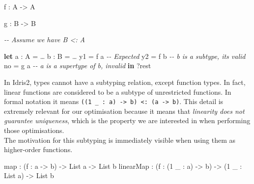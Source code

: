 \documentclass[
]{article}
\newenvironment{Shaded}{}{}
\newcommand{\CommentTok}[1]{\textcolor[rgb]{0.38,0.63,0.69}{\textit{#1}}}
\newcommand{\DataTypeTok}[1]{\textcolor[rgb]{0.56,0.13,0.00}{#1}}
\newcommand{\DecValTok}[1]{\textcolor[rgb]{0.25,0.63,0.44}{#1}}
\newcommand{\FunctionTok}[1]{\textcolor[rgb]{0.02,0.16,0.49}{#1}}
\newcommand{\KeywordTok}[1]{\textcolor[rgb]{0.00,0.44,0.13}{\textbf{#1}}}
\newcommand{\NormalTok}[1]{#1}
\newcommand{\OperatorTok}[1]{\textcolor[rgb]{0.40,0.40,0.40}{#1}}
\newcommand{\OtherTok}[1]{\textcolor[rgb]{0.00,0.44,0.13}{#1}}
\begin{document}
\begin{Shaded}
\begin{Highlighting}[]

\NormalTok{f }\OperatorTok{:} \DataTypeTok{A} \OtherTok{{-}\textgreater{}} \DataTypeTok{A}

\NormalTok{g }\OperatorTok{:} \DataTypeTok{B} \OtherTok{{-}\textgreater{}} \DataTypeTok{B}

\CommentTok{{-}{-} Assume we have B \textless{}: A}

\KeywordTok{let}\NormalTok{ a }\OperatorTok{:} \DataTypeTok{A} \OtherTok{=}\NormalTok{ …}
\NormalTok{    b }\OperatorTok{:} \DataTypeTok{B} \OtherTok{=}\NormalTok{ … }
\NormalTok{    y1 }\OtherTok{=}\NormalTok{ f a }\CommentTok{{-}{-} Expected}
\NormalTok{    y2 }\OtherTok{=}\NormalTok{ f b }\CommentTok{{-}{-} b is a subtype, it\textquotesingle{}s valid}
\NormalTok{    no }\OtherTok{=}\NormalTok{ g a }\CommentTok{{-}{-} a is a supertype of b, invalid}
 \KeywordTok{in} \OperatorTok{?}\NormalTok{rest}
\end{Highlighting}
\end{Shaded}

In Idris2, types cannot have a subtyping relation, except function
types. In fact, linear functions are considered to be a subtype of
unrestricted functions. In formal notation it means
\texttt{((1\ \_\ :\ a)\ -\textgreater{}\ b)\ \textless{}:\ (a\ -\textgreater{}\ b)}.
This detail is extremely relevant for our optimisation because it means
that \emph{linearity does not guarantee uniqueness}, which is the
property we are interested in when performing those optimisations.\\
The motivation for this subtyping is immediately visible when using them
as higher-order functions.

\begin{Shaded}
\begin{Highlighting}[]
\FunctionTok{map} \OperatorTok{:}\NormalTok{ (f }\OperatorTok{:}\NormalTok{ a }\OtherTok{{-}\textgreater{}}\NormalTok{ b) }\OtherTok{{-}\textgreater{}} \DataTypeTok{List}\NormalTok{ a }\OtherTok{{-}\textgreater{}} \DataTypeTok{List}\NormalTok{ b}
\NormalTok{linearMap }\OperatorTok{:}\NormalTok{ (f }\OperatorTok{:}\NormalTok{ (}\DecValTok{1}\NormalTok{ \_ }\OperatorTok{:}\NormalTok{ a) }\OtherTok{{-}\textgreater{}}\NormalTok{ b) }\OtherTok{{-}\textgreater{}}\NormalTok{ (}\DecValTok{1}\NormalTok{ \_ }\OperatorTok{:} \DataTypeTok{List}\NormalTok{ a) }\OtherTok{{-}\textgreater{}} \DataTypeTok{List}\NormalTok{ b}
\end{Highlighting}
\end{Shaded}
\end{document}

